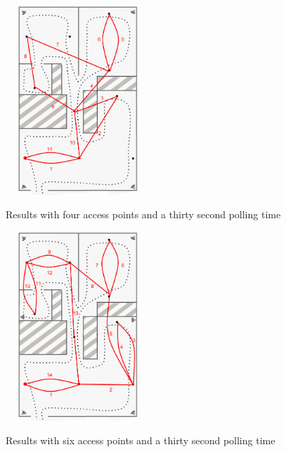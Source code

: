 \begin{figure}
	\centering
	\begin{minipage}{0.45\textwidth}
		\ \includegraphics[width=2in,height=2.8in]{loc1_4ap_30s.png}
		\caption{Results with four access points and a thirty second polling time}
		\label{loc1_4ap_30s}
	\end{minipage}\hfill
	\begin{minipage}{0.45\textwidth}
		\centering
		\ \includegraphics[width=2in,height=2.8in]{loc1_6ap_30s.png}
		\caption{Results with six access points and a thirty second polling time}
		\label{loc1_6ap_10s}
	\end{minipage}
\end{figure}
